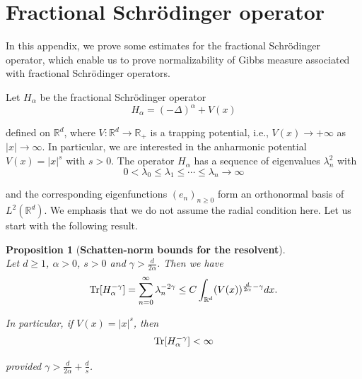 \documentclass[%
11pt,  reqno]{amsart}
\newtheorem{proposition}[theorem]{Proposition}
\theoremstyle{remarkstyle}
\newcommand{\1}{\hspace{0.2mm}\text{I}\hspace{0.2mm}}
\newcommand{\noi}{\noindent}
\newcommand{\R}{\mathbb{R}}
\newcommand{\al}{\alpha}
\newcommand{\g}{\gamma}
\newcommand{\ld}{\lambda}
\numberwithin{equation}{section}
\numberwithin{theorem}{section}
\begin{document}
	
	\section{Fractional Schr\"odinger operator}
	
	In this appendix,
	we prove some estimates for the fractional Schr\"odinger operator,
	which enable us to prove normalizability of Gibbs measure associated with fractional Schr\"odinger operators. 
	
	Let $H_\al$ be the fractional Schr\"odinger operator
	\[
	H_\al = (-\Delta)^{\al} + V(x)
	\]
	
	\noi 
	defined on $\R^d$, where $V: \R^d \to \R_+$ is a trapping potential, i.e., $V(x) \to +\infty$ as $|x| \to \infty$. In particular, we are interested in the anharmonic potential $V(x) = |x|^s$ with $s > 0$.
	The operator $H_\al$ has a sequence of eigenvalues $\ld_n^2$ with 
	\[
	0 < \ld_0 \le \ld_1 \le \cdots \le \ld_n \to \infty 
	\]
	
	\noi 
	and the corresponding eigenfunctions $(e_n)_{n \ge 0}$ form an orthonormal basis of $L^2 (\R^d)$. We emphasis that we do not assume the radial condition here. Let us start with the following result.
	
	\begin{proposition} [\bf Schatten-norm bounds for the resolvent] 
		\label{PROP:LS} \mbox{} \\
		Let $d\ge 1$, $\al>0$, $s>0$ and $\g > \frac{d}{2\al}$.
		Then we have
		\begin{align}
			\label{LT}
			{\rm Tr} [H_\al^{-\g}] = \sum_{n=0}^\infty \ld_n^{-2\g} \le C \int_{\R^d} (V(x))^{\frac{d}{2\al} - \g} dx.
		\end{align}
		
		\noi 
		In particular, if $V(x) = |x|^s$, then
		\[
		{\rm Tr} [H_\al^{-\g}] < \infty
		\]
		
		\noi 
		provided $\g > \frac{d}{2\al} + \frac{d}{s}$.
	\end{proposition}
	
\end{document}
